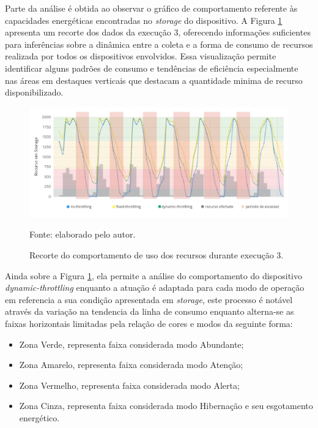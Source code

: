 Parte da análise é obtida ao observar o gráfico de comportamento referente às capacidades energéticas encontradas no \textit{storage} do dispositivo. A Figura \ref{fig:cap6recortecomportamentostorage} apresenta um recorte dos dados da execução 3, oferecendo informações suficientes para inferências sobre a dinâmica entre a coleta e a forma de consumo de recursos realizada por todos os dispositivos envolvidos. Essa visualização permite identificar alguns padrões de consumo e tendências de eficiência especialmente nas áreas em destaques verticais que destacam a quantidade minima de recurso disponibilizado.

\begin{figure}[H]
	\centering	
	\caption{Recorte do comportamento de uso dos recursos durante execução 3.} 
	\label{fig:cap6recortecomportamentostorage}
	\noindent\includegraphics[width=1\linewidth]{Imagens/cap6/cap6recortecomportamentostorage.jpg} 
	
	Fonte: elaborado pelo autor.
\end{figure}

Ainda sobre a Figura \ref{fig:cap6recortecomportamentostorage}, ela permite a análise do comportamento do dispositivo \textit{dynamic-throttling} enquanto a atuação é adaptada para cada modo de operação em referencia a sua condição apresentada em \textit{storage}, este processo é notável através da variação na tendencia da linha de consumo enquanto alterna-se as faixas horizontais limitadas pela relação de cores e modos da seguinte forma:

\begin{itemize}
	\item Zona Verde, representa faixa considerada modo Abundante;
	\item Zona Amarelo, representa faixa considerada modo Atenção;
	\item Zona Vermelho, representa faixa considerada modo Alerta;
	\item Zona Cinza, representa faixa considerada modo Hibernação e seu esgotamento energético.
\end{itemize} 

